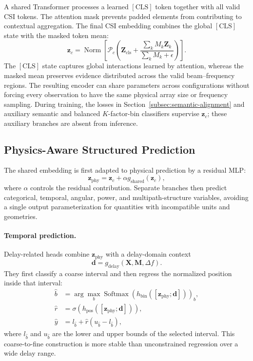A shared Transformer processes a learned $[\mathrm{CLS}]$ token together with all valid CSI tokens.
The attention mask prevents padded elements from contributing to contextual aggregation. The final CSI
embedding combines the global $[\mathrm{CLS}]$ state with the masked token mean:
\begin{equation}
\mathbf z_c=\operatorname{Norm}\!\left[
\mathcal P_c\!\left(
\mathbf Z_{\mathrm{cls}}+
\frac{\sum_k M_k\mathbf Z_k}{\sum_k M_k+\epsilon}
\right)\right].
\label{eq:shared-csi-embedding}
\end{equation}
The $[\mathrm{CLS}]$ state captures global interactions learned by attention, whereas the masked mean
preserves evidence distributed across the valid beam--frequency regions. The resulting encoder can share
parameters across configurations without forcing every observation to have the same physical array size
or frequency sampling. During training, the losses in Section~\ref{subsec:semantic-alignment} and
auxiliary semantic and balanced $K$-factor-bin classifiers supervise $\mathbf z_c$; these auxiliary
branches are absent from inference.

\subsection{Physics-Aware Structured Prediction}
\label{subsec:physics-prediction}

The shared embedding is first adapted to physical prediction by a residual MLP:
\begin{equation}
\mathbf z_{\mathrm{phy}}
=\mathbf z_c+\alpha g_{\mathrm{shared}}(\mathbf z_c),
\label{eq:physics-representation}
\end{equation}
where $\alpha$ controls the residual contribution. Separate branches then predict categorical,
temporal, angular, power, and multipath-structure variables, avoiding a single output parameterization
for quantities with incompatible units and geometries.

\paragraph{Temporal prediction.}
Delay-related heads combine $\mathbf z_{\mathrm{phy}}$ with a delay-domain context
\begin{equation}
\mathbf d=g_{\mathrm{delay}}(\mathbf X,\mathbf M,\Delta f).
\label{eq:delay-context}
\end{equation}
They first classify a coarse interval and then regress the normalized position inside that interval:
\begin{align}
\hat b
&=\arg\max_b\operatorname{Softmax}
\!\left(h_{\mathrm{bin}}([\mathbf z_{\mathrm{phy}};\mathbf d])\right)_b,
\label{eq:delay-bin}\\
\hat r
&=\sigma\!\left(h_{\mathrm{pos}}([\mathbf z_{\mathrm{phy}};\mathbf d])\right),
\label{eq:delay-position}\\
\hat y
&=l_{\hat b}+\hat r\left(u_{\hat b}-l_{\hat b}\right),
\label{eq:coarse-to-fine-delay}
\end{align}
where $l_{\hat b}$ and $u_{\hat b}$ are the lower and upper bounds of the selected interval. This
coarse-to-fine construction is more stable than unconstrained regression over a wide delay range.

